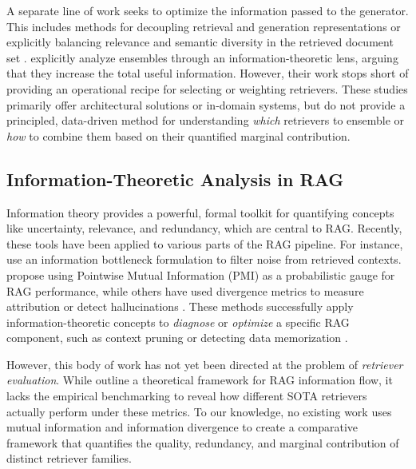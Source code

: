 \documentclass{article}
\theoremstyle{plain}
\theoremstyle{definition}
\theoremstyle{remark}
\begin{document}
A separate line of work seeks to optimize the information passed to the generator. This includes methods for decoupling retrieval and generation representations \citep{yang2025heterag} or explicitly balancing relevance and semantic diversity in the retrieved document set \citep{rezaei2025vendi}. \citet{chen2025revisiting} explicitly analyze ensembles through an information-theoretic lens, arguing that they increase the total useful information. However, their work stops short of providing an operational recipe for selecting or weighting retrievers. These studies primarily offer architectural solutions or in-domain systems, but do not provide a principled, data-driven method for understanding \emph{which} retrievers to ensemble or \emph{how} to combine them based on their quantified marginal contribution.

\subsection{Information-Theoretic Analysis in RAG}
Information theory provides a powerful, formal toolkit for quantifying concepts like uncertainty, relevance, and redundancy, which are central to RAG. Recently, these tools have been applied to various parts of the RAG pipeline. For instance, \citet{zhu2024information} use an information bottleneck formulation to filter noise from retrieved contexts. \citet{liu2024pointwise} propose using Pointwise Mutual Information (PMI) as a probabilistic gauge for RAG performance, while others have used divergence metrics to measure attribution \citep{li2025attributing} or detect hallucinations \citep{halperin2025prompt}. These methods successfully apply information-theoretic concepts to \emph{diagnose} or \emph{optimize} a specific RAG component, such as context pruning \citep{deng2025influence} or detecting data memorization \citep{anh2025repcs}.

However, this body of work has not yet been directed at the problem of \emph{retriever evaluation}. While \citet{yumucsak2025information} outline a theoretical framework for RAG information flow, it lacks the empirical benchmarking to reveal how different SOTA retrievers actually perform under these metrics. To our knowledge, no existing work uses mutual information and information divergence to create a comparative framework that quantifies the quality, redundancy, and marginal contribution of distinct retriever families.
\end{document}
